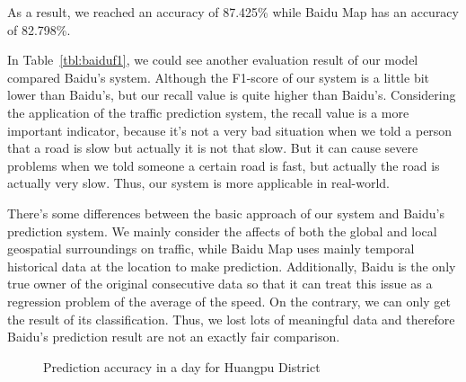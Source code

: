 As a result, we reached an accuracy of 87.425\% while Baidu Map has an accuracy of 82.798\%. 


In Table~\ref{tbl:baiduf1}, we could see another evaluation result of our model compared Baidu's system. Although the F1-score of our system is a little bit lower than Baidu's, but our recall value is quite higher than Baidu's. Considering the application of the traffic prediction system, the recall value is a more important indicator, because it's not a very bad situation when we told a person that a road is slow but actually it is not that slow. But it can cause severe problems when we told someone a certain road is fast, but actually the road is actually very slow. Thus, our system is more applicable in real-world.



There's some differences between the basic approach of our system and Baidu's
prediction system. We mainly consider the affects of both the global and local geospatial 
surroundings on traffic, while Baidu Map uses mainly temporal 
historical data at the location to make prediction. Additionally, Baidu is the only true owner of the original consecutive data so that it can treat this issue as a regression problem of the average of the speed. On the contrary, we can only get the result of its classification. Thus, we lost lots of meaningful data and therefore Baidu's prediction result are not an exactly fair comparison.

\begin{figure}[th]
\centering
{}
\caption{Prediction accuracy in a day for Huangpu District}
\label{fig:daytimeacc}
\end{figure}


